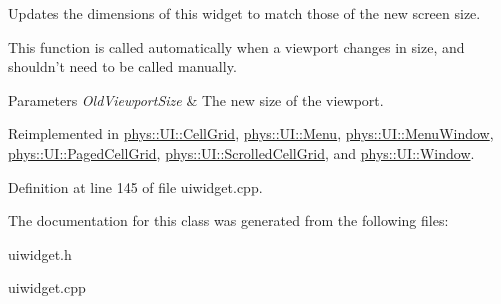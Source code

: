 Updates the dimensions of this widget to match those of the new screen size. 

This function is called automatically when a viewport changes in size, and shouldn't need to be called manually. 
\begin{DoxyParams}{Parameters}
{\em OldViewportSize} & The new size of the viewport. \\
\hline
\end{DoxyParams}


Reimplemented in \hyperlink{classphys_1_1UI_1_1CellGrid_addbc1338b3b321018cbaf3ff787837e5}{phys::UI::CellGrid}, \hyperlink{classphys_1_1UI_1_1Menu_a60a678cc2be8f3eebfe65b3628557928}{phys::UI::Menu}, \hyperlink{classphys_1_1UI_1_1MenuWindow_a9845f7bd61f5c3f06594c4bbcbd4e063}{phys::UI::MenuWindow}, \hyperlink{classphys_1_1UI_1_1PagedCellGrid_a7d6ddd7126f86d2ea6592ac3f9a91037}{phys::UI::PagedCellGrid}, \hyperlink{classphys_1_1UI_1_1ScrolledCellGrid_aed1f61cbdab04c555e26076ec933bbf2}{phys::UI::ScrolledCellGrid}, and \hyperlink{classphys_1_1UI_1_1Window_a0be6c93e5660757a5f94227f2e076ba9}{phys::UI::Window}.



Definition at line 145 of file uiwidget.cpp.



The documentation for this class was generated from the following files:\begin{DoxyCompactItemize}
\item 
uiwidget.h\item 
uiwidget.cpp\end{DoxyCompactItemize}
